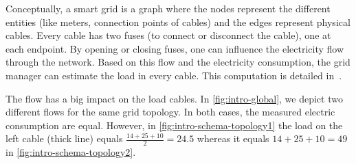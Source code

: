 



Conceptually, a smart grid is a graph where the nodes represent the different entities (like meters, connection points of cables) and the edges represent physical cables.
Every cable has two fuses (to connect or disconnect the cable), one at each endpoint.
By opening or closing fuses, one can influence the electricity flow through the network.
Based on this flow and the electricity consumption, the grid manager can estimate the load in every cable.
This computation is detailed in~\cite{DBLP:conf/sac/0001MFRKT16}.

The flow has a big impact on the load cables.
In \autoref{fig:intro-global}, we depict two different flows for the same grid topology.
In both cases, the measured electric consumption are equal.
However, in \autoref{fig:intro-schema-topology1} the load on the left cable (thick line) equals $\frac{14 + 25 + 10}{2} = 24.5$ whereas it equals $14+25+10=49$ in \autoref{fig:intro-schema-topology2}.